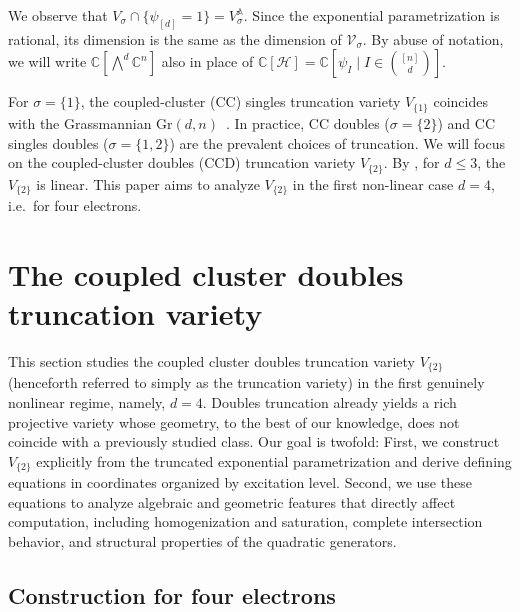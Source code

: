 \documentclass[11pt,reqno]{amsart}
\theoremstyle{definition}
\numberwithin{theorem}{section}
\numberwithin{equation}{section}
\begin{document}
\noindent We observe that $V_{\sigma} \cap \{ \psi_{[d]} =1\} = V_{\sigma}^{\mathbb A}$.
Since the exponential parametrization is rational, its dimension is the same as the dimension of $\mathcal V_{\sigma}$. By abuse of notation, we will write $\mathbb C[\bigwedge^d\mathbb C^n]$ also in place of $\mathbb C[\mathcal{H}]= \mathbb C[\psi_I \mid I \in \binom{[n]}{d}]$.

For $\sigma = \{1\}$, the coupled-cluster (CC) singles truncation variety $V_{\{1\}}$ coincides with the Grassmannian $\mathrm{Gr}(d, n)$~\cite{borovik2024coupled}. In practice, CC doubles ($\sigma = \{2\}$) and CC singles doubles ($\sigma = \{1,2\}$) are the prevalent choices of truncation. We will focus on the coupled-cluster doubles (CCD) truncation variety $V_{\{2\}}$.
By \cite[Theorem~3.10]{faulstich2024algebraic}, for $d \leq 3$, the $V_{\{2\}}$ is linear. 
This paper aims to analyze $V_{\{2\}}$ in the first non-linear case $d = 4$, i.e.\ for four electrons.

\section{The coupled cluster doubles truncation variety}\label{Section 2}

This section studies the coupled cluster doubles truncation variety $V_{\{2\}}$ (henceforth referred to simply as the truncation variety) in the first genuinely nonlinear regime, namely, $d=4$. Doubles truncation already yields a rich projective variety whose geometry, to the best of our knowledge, does not coincide with a previously studied class. Our goal is twofold: First, we construct $V_{\{2\}}$ explicitly from the truncated exponential parametrization and derive defining equations in coordinates organized by excitation level. Second, we use these equations to analyze algebraic and geometric features that directly affect computation, including homogenization and saturation, complete intersection behavior, and structural properties of the quadratic generators. 

\subsection{Construction for four electrons}
\end{document}
